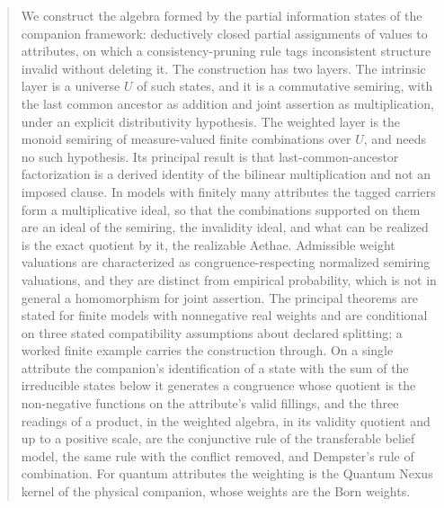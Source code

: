 \maketitle

\begin{abstract}
\noindent We construct the algebra formed by the partial information states of the companion framework: deductively closed partial assignments of values to attributes, on which a consistency-pruning rule tags inconsistent structure invalid without deleting it. The construction has two layers. The intrinsic layer is a universe $U$ of such states, and it is a commutative semiring, with the last common ancestor as addition and joint assertion as multiplication, under an explicit distributivity hypothesis. The weighted layer is the monoid semiring of measure-valued finite combinations over $U$, and needs no such hypothesis. Its principal result is that last-common-ancestor factorization is a derived identity of the bilinear multiplication and not an imposed clause. In models with finitely many attributes the tagged carriers form a multiplicative ideal, so that the combinations supported on them are an ideal of the semiring, the invalidity ideal, and what can be realized is the exact quotient by it, the realizable Aethae. Admissible weight valuations are characterized as congruence-respecting normalized semiring valuations, and they are distinct from empirical probability, which is not in general a homomorphism for joint assertion. The principal theorems are stated for finite models with nonnegative real weights and are conditional on three stated compatibility assumptions about declared splitting; a worked finite example carries the construction through. On a single attribute the companion's identification of a state with the sum of the irreducible states below it generates a congruence whose quotient is the non-negative functions on the attribute's valid fillings, and the three readings of a product, in the weighted algebra, in its validity quotient and up to a positive scale, are the conjunctive rule of the transferable belief model, the same rule with the conflict removed, and Dempster's rule of combination. For quantum attributes the weighting is the Quantum Nexus kernel of the physical companion, whose weights are the Born weights.

\end{abstract}

